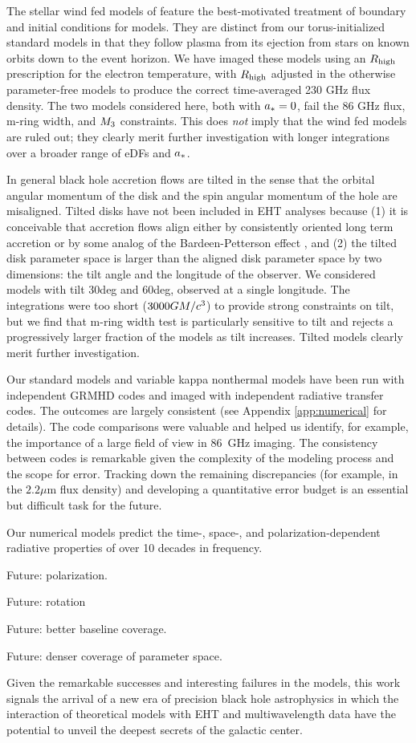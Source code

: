 The stellar wind fed models of \cite{2020ApJ...896L...6R} feature the best-motivated treatment of boundary and initial conditions for \sgra models.  They are distinct from our torus-initialized standard models in that they follow plasma from its ejection from stars on known orbits down to the event horizon.  We have imaged these models using an $R_\mathrm{high}$ prescription for the electron temperature, with $R_\mathrm{high}$ adjusted in the otherwise parameter-free models to produce the correct time-averaged 230 GHz flux density.  The two models considered here, both with $a_* = 0$, fail the $86$ GHz flux, m-ring width, and $M_{3}$ constraints.  This does {\em not} imply that the wind fed models are ruled out; they clearly merit further investigation with longer integrations over a broader range of eDFs and $a_*$.

In general black hole accretion flows are tilted in the sense that the orbital angular momentum of the disk and the spin angular momentum of the hole are misaligned.  Tilted disks have not been included in EHT analyses because (1) it is conceivable that accretion flows align either by consistently oriented long term accretion or by some analog of the Bardeen-Petterson effect \citep{1975ApJ...195L..65B}, and (2) the tilted disk parameter space is larger than the aligned disk parameter space by two dimensions: the tilt angle and the longitude of the observer.  We considered models with tilt $30$deg and $60$deg, observed at a single longitude.  The integrations were too short ($3000 GM/c^3$) to provide strong constraints on tilt, but we find that m-ring width test is particularly sensitive to tilt and rejects a progressively larger fraction of the models as tilt increases.  Tilted models clearly merit further investigation.

Our standard models and variable kappa nonthermal models have been run with independent GRMHD codes and imaged with independent radiative transfer codes.  The outcomes are largely consistent (see Appendix \ref{app:numerical} for details).  The code comparisons were valuable and helped us identify, for example, the importance of a large field of view in 86~GHz imaging.  The consistency between codes is remarkable given the complexity of the modeling process and the scope for error.  Tracking down the remaining discrepancies (for example, in the $2.2\mu$m flux density) and developing a quantitative error budget is an essential but difficult task for the future.

Our numerical models predict the time-, space-, and polarization-dependent radiative properties of \sgra over 10 decades in frequency.

Future: polarization.

Future: rotation

Future: better baseline coverage.

Future: denser coverage of parameter space.

Given the remarkable successes and interesting failures in the models, this work signals the arrival of a new era of precision black hole astrophysics in which the interaction of  theoretical models with EHT and multiwavelength data have the potential to unveil the deepest secrets of the galactic center.
